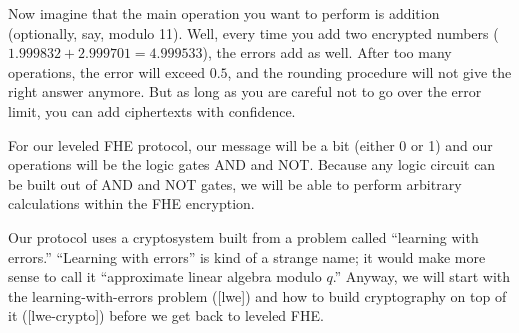 Now imagine that the main operation you want to perform is addition
(optionally, say, modulo 11). Well, every time you add two encrypted
numbers (\(1.999832 + 2.999701 = 4.999533\)), the errors add as well.
After too many operations, the error will exceed \(0.5\), and the
rounding procedure will not give the right answer anymore. But as long
as you are careful not to go over the error limit, you can add
ciphertexts with confidence.

For our leveled FHE protocol, our message will be a bit (either 0 or 1)
and our operations will be the logic gates AND and NOT. Because any
logic circuit can be built out of AND and NOT gates, we will be able to
perform arbitrary calculations within the FHE encryption.

Our protocol uses a cryptosystem built from a problem called ``learning
with errors.'' ``Learning with errors'' is kind of a strange name; it
would make more sense to call it ``approximate linear algebra modulo
\(q\).'' Anyway, we will start with the learning-with-errors problem
({[}lwe{]}) and how to build cryptography on top of it
({[}lwe-crypto{]}) before we get back to leveled FHE.

